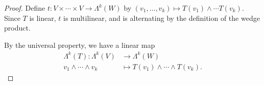 \documentclass[10pt]{mypackage}
\begin{document}
    \begin{proof}
      Define $t: V\times\cdots\times V\rightarrow \Lambda^{k}\left(W\right)$ by $\left(v_1,\dots,v_k\right)\mapsto T\left(v_1\right)\wedge\cdots T\left(v_{k}\right)$. Since $T$ is linear, $t$ is multilinear, and is alternating by the definition of the wedge product.\newline

      By the universal property, we have a linear map
      \begin{align*}
        \Lambda^{k}\left(T\right): \Lambda^{k}\left(V\right)&\rightarrow  \Lambda^{k}\left(W\right)\\
        v_1\wedge\cdots\wedge v_k &\mapsto T\left(v_1\right)\wedge\cdots\wedge T\left(v_k\right).
      \end{align*}
    \end{proof}
\end{document}

